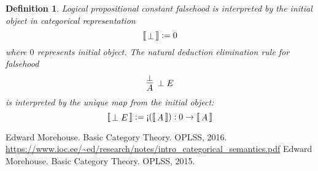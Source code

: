 \documentclass{article}
\newtheorem{definition}[theorem]{Definition}
\newcommand{\dbracket}[1]{\ensuremath{\left\llbracket\,\vcenter{\hbox{$#1$}}\,\right\rrbracket}}
\begin{document}
\begin{definition}
\rm Logical propositional constant falsehood is interpreted by the initial object in categorical representation
$$
\dbracket{\perp} := 0
$$
where $0$ represents initial object. The natural deduction elimination rule for falsehood
$$
\infer[\perp E]{A}{\perp}
$$
is interpreted by the unique map from the initial object:
$$
\dbracket{\perp E} := \mbox{!`}(\dbracket{A}): 0 \to \dbracket{A}
$$
\end{definition}

\newpage
\begin{thebibliography}{00}
 Edward Morehouse. Basic Category Theory. OPLSS, 2016. \url{https://www.ioc.ee/~ed/research/notes/intro_categorical_semantics.pdf}
 Edward Morehouse. Basic Category Theory. OPLSS, 2015.
\end{thebibliography}
\end{document}
